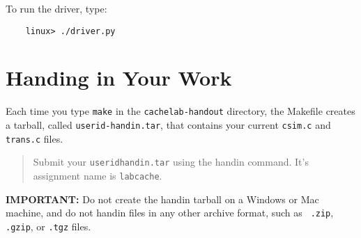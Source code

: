 \documentclass[11pt]{article}
\begin{document}
To run the driver, type:
\begin{verbatim}
    linux> ./driver.py
\end{verbatim}


\section{Handing in Your Work}
Each time you type {\tt make} in the \verb:cachelab-handout: directory,
  the Makefile creates a tarball, called {\tt userid-handin.tar},
  that contains your current {\tt csim.c} and {\tt trans.c} files.

\begin{quote}
Submit your {\tt  userid\-handin.tar} using the handin command. It's assignment
name is {\tt labcache}.
\end{quote}

{\bf IMPORTANT:} Do not create the handin tarball on a Windows or Mac machine,
and do not handin files in any other archive format, such as {\tt
  .zip}, {\tt .gzip}, or {\tt .tgz} files.
\end{document}

